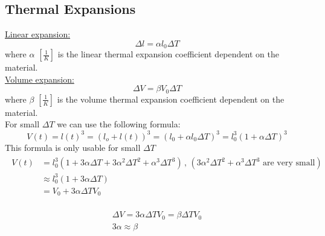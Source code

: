 \documentclass[a4paper,11pt]{article}
\begin{document}
 \begin{figure}[!ht]
   \centering
 \end{figure}

\pagebreak

\subsection{Thermal Expansions}
\underline{Linear expansion:} \\
$$ \Delta l = \alpha l_0 \Delta T $$
where $\alpha$ $\left[ \frac{1}{K} \right] $ is the linear thermal expansion coefficient dependent on the material. \\
\underline{Volume expansion:} \\
$$ \Delta V = \beta V_0 \Delta T $$
where $\beta$ $\left[ \frac{1}{K} \right] $ is the volume thermal expansion coefficient dependent on the material. \\
For small $\Delta T$ we can use the following formula: 
$$V(t) = l(t)^3 = (l_o + l(t))^3 = (l_0 + \alpha l_0 \Delta T )^3 = l_0^3(1+\alpha \Delta T)^3 $$
This formula is only usable for small $\Delta T$  \\
\begin{align}
  \begin{aligned}
    V(t) & =l_0^3\left(1+3 \alpha \Delta T+3 \alpha^2 \Delta T^2+\alpha^3 \Delta T^3\right) \, , \, \left(3 \alpha^2 \Delta T^2+\alpha^3 \Delta T^3 \, \, \text{are very small} \right)  \\
    & \approx l_0^3(1+3 \alpha \Delta T) \\
    & =V_0+3 \alpha \Delta T V_0
  \end{aligned}
\end{align}

\begin{align*}
  \begin{gathered}
    \Delta V=3 \alpha \Delta T V_0=\beta \Delta T V_0 \\
    3 \alpha \approx \beta
    \end{gathered}
\end{align*}
\end{document}
